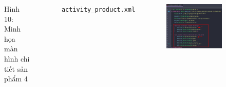\documentclass{beamer}
\begin{document}
\begin{frame}
\begin{columns}
\begin{figure}
            \caption{\centering\tiny{Hình 10: Minh họa màn hình chi tiết sản phẩm 4}}
        \end{figure}
        \indent \texttt{activity\_product.xml}
        \begin{figure}
            \centering
            \includegraphics[width=\textwidth]{images/36.png}
        \end{figure}
    \end{columns}
\end{frame}
\end{document}
